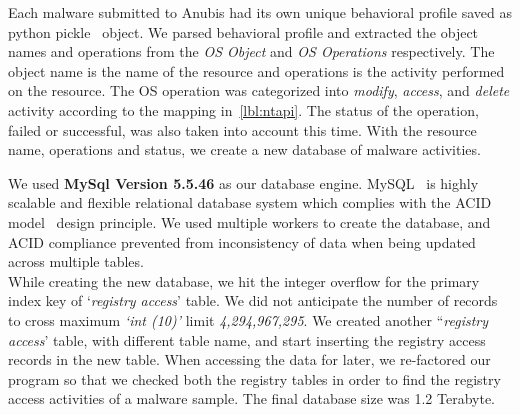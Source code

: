 Each malware submitted to Anubis had its own unique behavioral profile saved as python pickle~\cite{pythonpickle} object.
We parsed behavioral profile and extracted the object names and operations from the \emph{OS Object} and \emph{OS Operations} respectively.
The object name is the name of the resource and operations is the activity performed on the resource.
The OS operation was categorized into \emph{modify}, \emph{access}, and \emph{delete} activity according to the mapping in~\autoref{lbl:ntapi}.
The status of the operation, failed or successful, was also taken into account this time.
With the resource name, operations and status, we create a new database of malware activities.

We used \textbf{MySql Version 5.5.46} as our database engine. MySQL~\cite[]{mysql} is highly scalable and flexible relational database system which complies with the ACID model~\cite[]{acid} design principle.
We used multiple workers to create the database, and ACID compliance prevented from inconsistency of data when being updated across multiple tables.\\

While creating the new database, we hit the integer overflow for the primary index key of `\emph{registry access}' table.
We did not anticipate the number of records to cross maximum \emph{`int (10)'} limit \emph{4,294,967,295}.
We created another ``\emph{registry access}' table, with different table name, and start inserting the registry access records in the new table.
When accessing the data for later, we re-factored our program so that we checked both the registry tables in order to find the registry access activities of a malware sample.
The final database size was 1.2 Terabyte.\\

